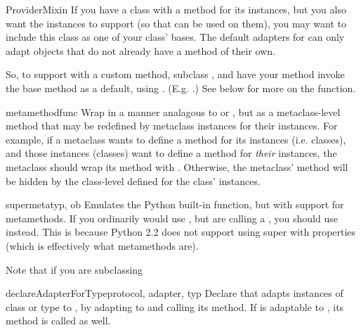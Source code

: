 \begin{verbatim%
}
\begin{verbatim%
}
\begin{verbatim%
}
\begin{verbatim%
}
\begin{verbatim%
}
\begin{verbatim%
}
\begin{classdesc*}{ProviderMixin}
If you have a class with a  method for its instances, but
you also want the instances to support  (so that
 can be used on them), you may want to include this
class as one of your class' bases.  The default adapters for
 can only adapt objects that do not already have a
 method of their own.

So, to support  with a custom 
method, subclass , and have your 
method invoke the base  method as a default, using
.  (E.g. .)  See below for more on
the  function.
\end{classdesc*}


\begin{funcdesc}{metamethod}{func}
Wrap  in a manner analagous to  or
, but as a metaclass-level method that may be redefined
by metaclass instances for their instances.  For example, if a metaclass wants
to define a  method for its instances (i.e. classes), and
those instances (classes) want to define a  method for
\emph{their} instances, the metaclass should wrap its 
method with .  Otherwise, the metaclass'
 method will be hidden by the class-level
 defined for the class' instances.
\end{funcdesc}


\begin{funcdesc}{supermeta}{typ, ob}
Emulates the Python built-in  function, but with support for
metamethods.  If you ordinarily would use , but are calling a
, you should use  instead.  This is
because Python 2.2 does not support using super with properties (which is
effectively what metamethods are).

Note that if you are subclassing 
\end{funcdesc}


\begin{funcdesc}{declareAdapterForType}{protocol, adapter, typ }
Declare that  adapts instances of class or type 
to , by adapting  to  and
calling its  method.  If  is adaptable
to , its  method is
called as well.
\end{funcdesc}



\end{verbatim%
}
\end{verbatim%
}
\end{verbatim%
}
\end{verbatim%
}
\end{verbatim%
}
\end{verbatim%
}
